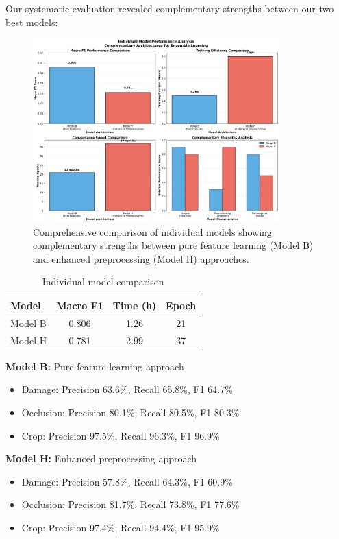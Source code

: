 \documentclass[12pt]{article}
\begin{document}
Our systematic evaluation revealed complementary strengths between our two best models:

\begin{figure}[!htb]
\centering
\includegraphics[width=0.85\textwidth]{images/model_comparison_detailed.png}
\caption{Comprehensive comparison of individual models showing complementary strengths between pure feature learning (Model B) and enhanced preprocessing (Model H) approaches.}
\end{figure}

\begin{table}[!h]
\centering
\begin{tabular}{lccc}
\toprule
\textbf{Model} & \textbf{Macro F1} & \textbf{Time (h)} & \textbf{Epoch} \\
\midrule
Model B & 0.806 & 1.26 & 21 \\
Model H & 0.781 & 2.99 & 37 \\
\bottomrule
\end{tabular}
\caption{Individual model comparison}
\end{table}

\noindent\textbf{Model B:} Pure feature learning approach
\begin{itemize}[itemsep=1pt,parsep=0pt,topsep=2pt]
\item Damage: Precision 63.6\%, Recall 65.8\%, F1 64.7\%
\item Occlusion: Precision 80.1\%, Recall 80.5\%, F1 80.3\%
\item Crop: Precision 97.5\%, Recall 96.3\%, F1 96.9\%
\end{itemize}

\noindent\textbf{Model H:} Enhanced preprocessing approach
\begin{itemize}[itemsep=1pt,parsep=0pt,topsep=2pt]
\item Damage: Precision 57.8\%, Recall 64.3\%, F1 60.9\%
\item Occlusion: Precision 81.7\%, Recall 73.8\%, F1 77.6\%
\item Crop: Precision 97.4\%, Recall 94.4\%, F1 95.9\%
\end{itemize}
\end{document}
